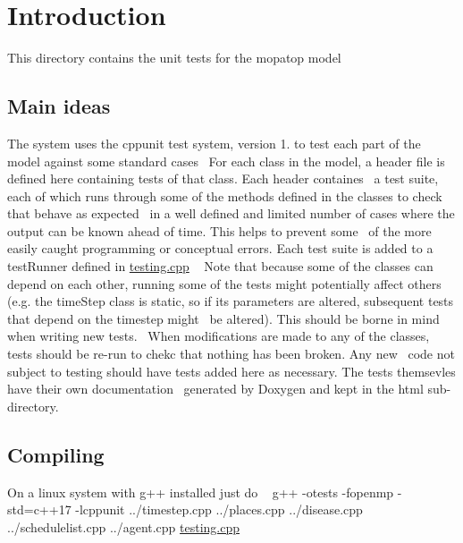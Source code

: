 \hypertarget{index_intro_sec}{}\section{Introduction}\label{index_intro_sec}
This directory contains the unit tests for the mopatop model \hypertarget{index_Main}{}\subsection{Main ideas}\label{index_Main}
The system uses the cppunit test system, version 1. to test each part of the model against some standard cases~\newline
For each class in the model, a header file is defined here containing tests of that class. Each header containes~\newline
a test suite, each of which runs through some of the methods defined in the classes to check that behave as expected~\newline
in a well defined and limited number of cases where the output can be known ahead of time. This helps to prevent some~\newline
of the more easily caught programming or conceptual errors. Each test suite is added to a test\+Runner defined in \mbox{\hyperlink{testing_8cpp}{testing.\+cpp}} ~\newline
Note that because some of the classes can depend on each other, running some of the tests might potentially affect others~\newline
(e.\+g. the time\+Step class is static, so if its parameters are altered, subsequent tests that depend on the timestep might~\newline
be altered). This should be borne in mind when writing new tests.~\newline
When modifications are made to any of the classes, tests should be re-\/run to chekc that nothing has been broken. Any new~\newline
code not subject to testing should have tests added here as necessary. The tests themsevles have their own documentation~\newline
generated by Doxygen and kept in the html sub-\/directory. \hypertarget{index_Compiling}{}\subsection{Compiling}\label{index_Compiling}
On a linux system with g++ installed just do ~\newline
g++ -\/otests -\/fopenmp -\/std=c++17 -\/lcppunit ../timestep.cpp ../places.cpp ../disease.cpp ../schedulelist.cpp ../agent.cpp \mbox{\hyperlink{testing_8cpp}{testing.\+cpp}}~\newline
